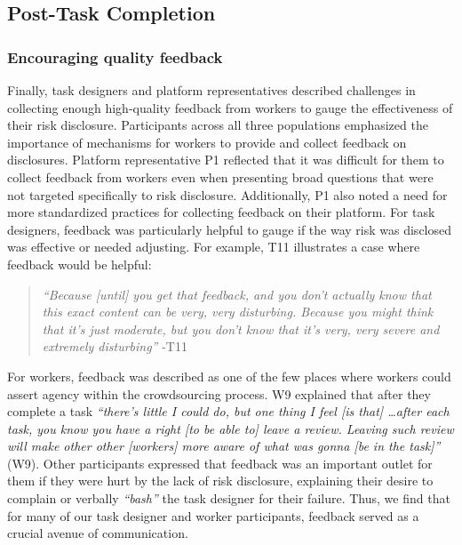 \subsection{Post-Task Completion}
\subsubsection{Encouraging quality feedback}
Finally, task designers and platform representatives described challenges in collecting enough high-quality feedback from workers to gauge the effectiveness of their risk disclosure. 
Participants across all three populations emphasized the importance of mechanisms for workers to provide and collect feedback on disclosures. Platform representative P1 reflected that it was difficult for them to collect feedback from workers even when presenting broad questions that were not targeted specifically to risk disclosure. Additionally, P1 also noted a need for more standardized practices for collecting feedback on their platform. For task designers, feedback was particularly helpful to gauge if the way risk was disclosed was effective or needed adjusting. For example, T11 illustrates a case where feedback would be helpful: 
\begin{quote}
    \textit{``Because [until] you get that feedback, and you don't actually know that this exact content can be very, very disturbing. Because you might think that it's just moderate, but you don't know that it's very, very severe and extremely disturbing''} -T11
\end{quote}
 For workers, feedback was described as one of the few places where workers could assert agency within the crowdsourcing process. W9 explained that after they complete a task \textit{``there's little I could do, but one thing I feel [is that] \dots after each task, you know you have a right [to be able to] leave a review. Leaving such review will make other other [workers] more aware of what was gonna [be in the task]''} (W9). Other participants expressed that feedback was an important outlet for them if they were hurt by the lack of risk disclosure, explaining their desire to complain or verbally \textit{``bash''} the task designer for their failure. Thus, we find that for many of our task designer and worker participants, feedback served as a crucial avenue of communication.



